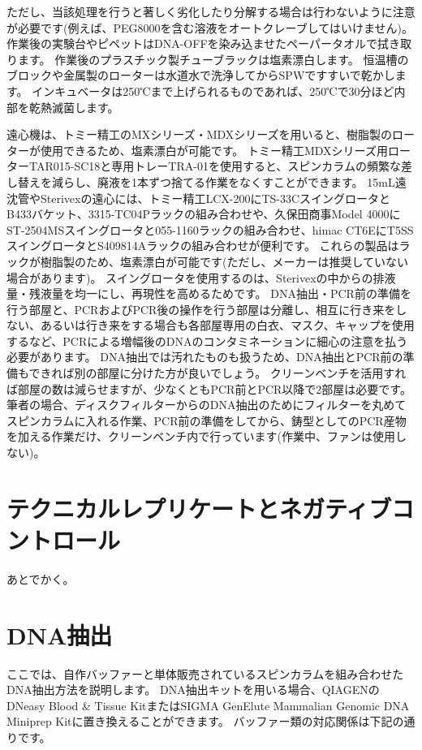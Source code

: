 \documentclass[titlepage,10pt,a4paper,uplatex]{jsbook}
\begin{document}
ただし、当該処理を行うと著しく劣化したり分解する場合は行わないように注意が必要です(例えば、PEG8000を含む溶液をオートクレーブしてはいけません)。
作業後の実験台やピペットはDNA-OFFを染み込ませたペーパータオルで拭き取ります。
作業後のプラスチック製チューブラックは塩素漂白します。
恒温槽のブロックや金属製のローターは水道水で洗浄してからSPWですすいで乾かします。
インキュベータは250℃まで上げられるものであれば、250℃で30分ほど内部を乾熱滅菌します。

遠心機は、トミー精工のMXシリーズ・MDXシリーズを用いると、樹脂製のローターが使用できるため、塩素漂白が可能です。
トミー精工MDXシリーズ用ローターTAR015-SC18と専用トレーTRA-01を使用すると、スピンカラムの頻繁な差し替えを減らし、廃液を1本ずつ捨てる作業をなくすことができます。
15mL遠沈管やSterivexの遠心には、トミー精工LCX-200にTS-33CスイングロータとB433バケット、3315-TC04Pラックの組み合わせや、久保田商事Model 4000にST-2504MSスイングロータと055-1160ラックの組み合わせ、himac CT6EにT5SSスイングロータとS409814Aラックの組み合わせが便利です。
これらの製品はラックが樹脂製のため、塩素漂白が可能です(ただし、メーカーは推奨していない場合があります)。
スイングロータを使用するのは、Sterivexの中からの排液量・残液量を均一にし、再現性を高めるためです。
DNA抽出・PCR前の準備を行う部屋と、PCRおよびPCR後の操作を行う部屋は分離し、相互に行き来をしない、あるいは行き来をする場合も各部屋専用の白衣、マスク、キャップを使用するなど、PCRによる増幅後のDNAのコンタミネーションに細心の注意を払う必要があります。
DNA抽出では汚れたものも扱うため、DNA抽出とPCR前の準備もできれば別の部屋に分けた方が良いでしょう。
クリーンベンチを活用すれば部屋の数は減らせますが、少なくともPCR前とPCR以降で2部屋は必要です。
筆者の場合、ディスクフィルターからのDNA抽出のためにフィルターを丸めてスピンカラムに入れる作業、PCR前の準備をしてから、鋳型としてのPCR産物を加える作業だけ、クリーンベンチ内で行っています(作業中、ファンは使用しない)。

\section{テクニカルレプリケートとネガティブコントロール}

あとでかく。

\section{DNA抽出}

ここでは、自作バッファーと単体販売されているスピンカラムを組み合わせたDNA抽出方法を説明します。
DNA抽出キットを用いる場合、QIAGENのDNeasy Blood \& Tissue KitまたはSIGMA GenElute Mammalian Genomic DNA Miniprep Kitに置き換えることができます。
バッファー類の対応関係は下記の通りです。
\end{document}
